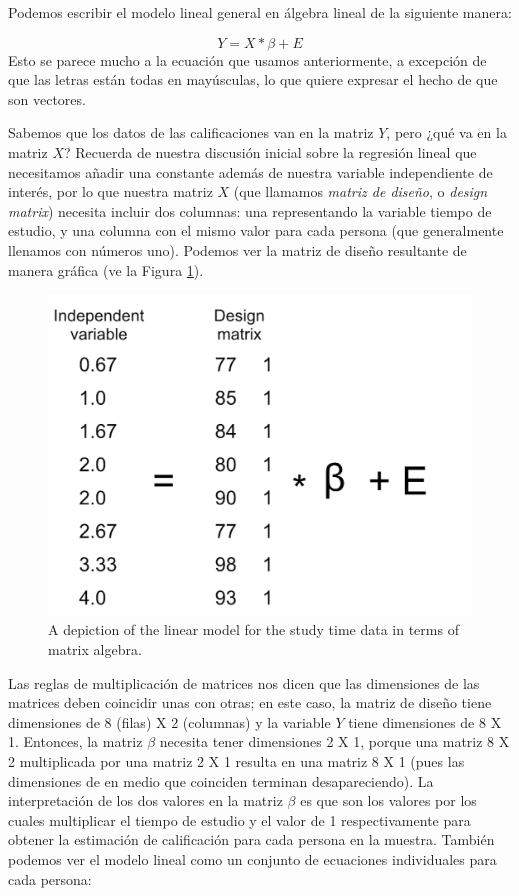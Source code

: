 \documentclass[
  12pt,
]{book}
\begin{document}
Podemos escribir el modelo lineal general en álgebra lineal de la siguiente manera:

\[
Y = X*\beta + E
\]
Esto se parece mucho a la ecuación que usamos anteriormente, a excepción de que las letras están todas en mayúsculas, lo que quiere expresar el hecho de que son vectores.

Sabemos que los datos de las calificaciones van en la matriz \(Y\), pero ¿qué va en la matriz \(X\)? Recuerda de nuestra discusión inicial sobre la regresión lineal que necesitamos añadir una constante además de nuestra variable independiente de interés, por lo que nuestra matriz \(X\) (que llamamos \emph{matriz de diseño}, o \emph{design matrix}) necesita incluir dos columnas: una representando la variable tiempo de estudio, y una columna con el mismo valor para cada persona (que generalmente llenamos con números uno). Podemos ver la matriz de diseño resultante de manera gráfica (ve la Figura \ref{fig:GLMmatrix}).

\begin{figure}
\includegraphics[width=16.67in]{images/glm_matrix} \caption{A depiction of the linear model for the study time data in terms of matrix algebra.}\label{fig:GLMmatrix}
\end{figure}

Las reglas de multiplicación de matrices nos dicen que las dimensiones de las matrices deben coincidir unas con otras; en este caso, la matriz de diseño tiene dimensiones de 8 (filas) X 2 (columnas) y la variable \(Y\) tiene dimensiones de 8 X 1. Entonces, la matriz \(\beta\) necesita tener dimensiones 2 X 1, porque una matriz 8 X 2 multiplicada por una matriz 2 X 1 resulta en una matriz 8 X 1 (pues las dimensiones de en medio que coinciden terminan desapareciendo). La interpretación de los dos valores en la matriz \(\beta\) es que son los valores por los cuales multiplicar el tiempo de estudio y el valor de 1 respectivamente para obtener la estimación de calificación para cada persona en la muestra. También podemos ver el modelo lineal como un conjunto de ecuaciones individuales para cada persona:
\end{document}
